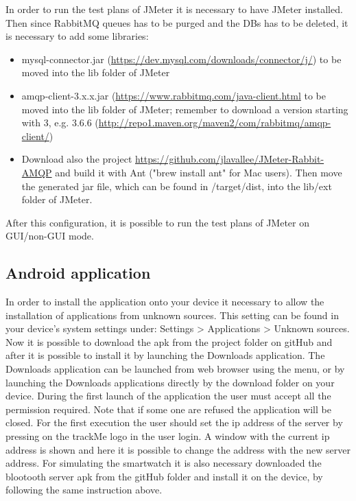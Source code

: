 \par
In order to run the test plans of JMeter it is necessary to have JMeter installed. Then since RabbitMQ queues has to be purged and the DBs has to be deleted, it is necessary to add some libraries:
\begin{itemize}
\item mysql-connector.jar (\url{https://dev.mysql.com/downloads/connector/j/}) to be moved into the lib folder of JMeter
\item amqp-client-3.x.x.jar (\url{https://www.rabbitmq.com/java-client.html} to be moved into the lib folder of JMeter; remember to download a version starting with 3, e.g. 3.6.6 (\url{http://repo1.maven.org/maven2/com/rabbitmq/amqp-client/})
\item Download also the project \url{https://github.com/jlavallee/JMeter-Rabbit-AMQP} and build it with Ant ("brew install ant" for Mac users). Then move the generated jar file, which can be found in /target/dist, into the lib/ext folder of JMeter.
\end{itemize}
After this configuration, it is possible to run the test plans of JMeter on GUI/non-GUI mode.

\subsection{Android application}
In order to install the application onto your device  it necessary to allow the installation of applications from unknown sources. This setting can be found in your device's system settings under: Settings > Applications > Unknown sources. 
\\
Now it is possible to download the apk from the project folder on gitHub and after it is possible to install it by launching the Downloads application. The Downloads application can be launched from web browser using the menu, or by launching the Downloads applications directly by the download folder on your device. During the first launch of the application the user must accept all the permission required. Note that if some one are refused the application will be closed. For the first execution the user should set the ip address of the server by pressing on the trackMe logo in the user login. A window with the current ip address is shown and here it is possible to change the address with the new server address. For simulating the smartwatch it is also necessary downloaded the blootooth server apk from the gitHub folder and install it on the device, by following the same instruction above.

